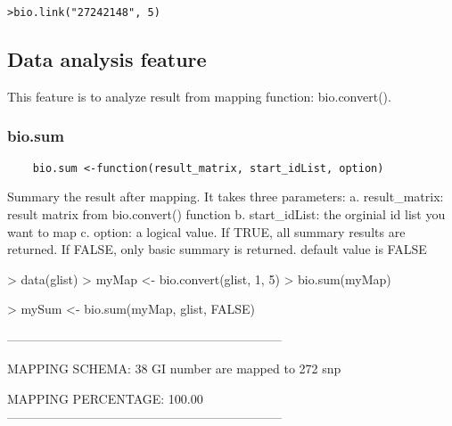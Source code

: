 \documentclass[a4paper]{article}
\begin{document}
\begin{verbatim}
>bio.link("27242148", 5)
\end{verbatim}

\subsection{Data analysis feature}
This feature is to analyze result from mapping function: bio.convert().
\subsubsection{bio.sum}
\begin{verbatim}
	bio.sum <-function(result_matrix, start_idList, option)
\end{verbatim}
Summary the result after mapping. \linebreak[2]
It takes three parameters: \newline
a. result\_matrix: result matrix from bio.convert() function\newline
b. start\_idList: the orginial id list you want to map\newline
c. option: a logical value. If TRUE, all summary results are returned. If FALSE, only basic summary is returned. default value is FALSE \newline

\begin{Schunk}
\begin{Sinput}
> data(glist)
> myMap <- bio.convert(glist, 1, 5)
> bio.sum(myMap)
\end{Sinput}
\begin{Sinput}
> mySum <- bio.sum(myMap, glist, FALSE)
\end{Sinput}
\begin{Soutput}
------------------------------------------------------------------

MAPPING SCHEMA:
38 GI number  are mapped to  272 snp 

MAPPING PERCENTAGE:
100.00% GI number  are mapped to  snp 
------------------------------------------------------------------
\end{Soutput}
\end{Schunk}
\end{document}
